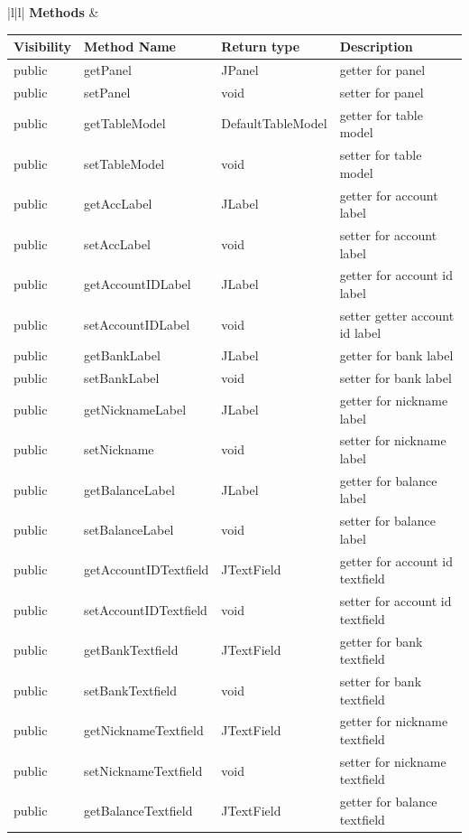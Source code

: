 \documentclass[12pt]{article}
\begin{document}
\begin{center}
\footnotesize
\begin{tabular}{|l|l|}
\hline
\textbf {Methods} &

\footnotesize
\begin{tabular}{l|l|l|p{5cm}}
\textbf{Visibility} & \textbf{Method Name} & \textbf{Return type} &\textbf{Description} \\ \hline
public  &getPanel&JPanel&getter for panel\\ \hline 
public  &setPanel&void&setter for panel\\ \hline 
public  &getTableModel&DefaultTableModel&getter for table model\\ \hline 
public  &setTableModel&void&setter for table model\\ \hline 
public  &getAccLabel&JLabel&getter for account label\\ \hline 
public  &setAccLabel&void&setter for account label\\ \hline 
public  &getAccountIDLabel&JLabel&getter for account id label\\ \hline 
public  &setAccountIDLabel&void&setter getter account id label\\ \hline 
public  &getBankLabel&JLabel&getter for bank label\\ \hline 
public  &setBankLabel&void&setter for bank label\\ \hline 
public  &getNicknameLabel&JLabel&getter for nickname label\\ \hline 
public  &setNickname&void&setter for nickname label\\ \hline 
public  &getBalanceLabel&JLabel&getter for balance label\\ \hline 
public  &setBalanceLabel&void&setter for balance label\\ \hline 
public  &getAccountIDTextfield&JTextField&getter for account id textfield\\ \hline 
public  &setAccountIDTextfield&void&setter for account id textfield\\ \hline 
public  &getBankTextfield&JTextField&getter for bank textfield\\ \hline 
public  &setBankTextfield&void&setter for bank textfield\\ \hline 
public  &getNicknameTextfield&JTextField&getter for nickname textfield\\ \hline 
public  &setNicknameTextfield&void&setter for nickname textfield\\ \hline 
public  &getBalanceTextfield&JTextField&getter for balance textfield\\ \hline 

\end{tabular}
\end{tabular}
\end{center}
\end{document}
